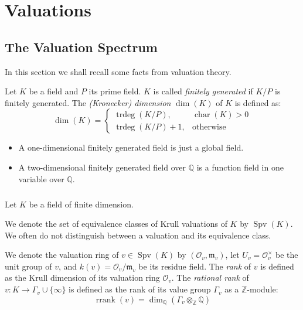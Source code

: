 \chapter{Valuations}

\section{The Valuation Spectrum}

In this section we shall recall some facts from valuation theory.

\begin{definition}
Let $K$ be a field and $P$ its prime field. $K$ is called \textit{finitely generated} if $K/P$ is finitely generated. The \textit{(Kronecker) dimension} $\dim(K)$ of $K$ is defined as:
\[\dim(K) = \begin{cases}
\operatorname{trdeg}(K/P), & \operatorname{char}(K)>0\\
\operatorname{trdeg}(K/P)+1, & \text{otherwise}
\end{cases} \]
\end{definition}

\begin{remark}
\begin{itemize}
\item A one-dimensional finitely generated field is just a global field. 
\item A two-dimensional finitely generated field over $\mathbb{Q}$ is a function field in one variable over $\mathbb{Q}$.
\end{itemize}
\end{remark}

\paragraph{} Let $K$ be a field of finite dimension.

\begin{definition}\label{2.1}
We denote the set of equivalence classes of Krull valuations of $K$ by $\operatorname{Spv}(K)$. We often do not distinguish between a valuation and its equivalence class. 

We denote the valuation ring of $v\in\operatorname{Spv}(K)$ by $(\mathcal{O}_v,\mathfrak{m}_v)$, let $U_v=\mathcal{O}_v^\times$ be the unit group of $v$, and $k(v)=\mathcal{O}_v/\mathfrak{m}_v$ be its residue field. The \textit{rank} of $v$ is defined as the Krull dimension of its valuation ring $\mathcal{O}_v$. The \textit{rational rank} of $v:K\to\Gamma_v\cup\{\infty\}$ is defined as the rank of its value group $\Gamma_v$ as a $\mathbb{Z}$-module:
\[\operatorname{rrank}(v) = \dim_\mathbb{Q}(\Gamma_v\otimes_\mathbb{Z}\mathbb{Q}) \]
\end{definition}

